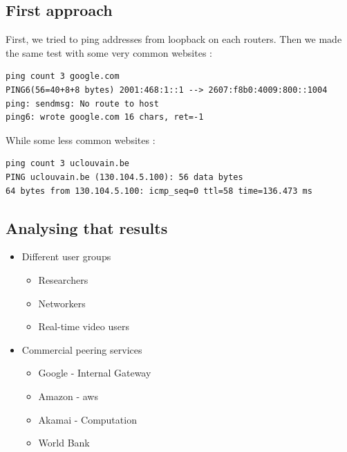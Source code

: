 \documentclass[usenames,dvipsnames]{beamer}
\begin{document}
\subsection{First approach}
\begin{frame}[fragile]{\insertsection}
\textbf{\insertsubsection}
\vfill
First, we tried to ping addresses from loopback on each routers. Then we made the same test with some very common websites :
\begin{lstlisting}
ping count 3 google.com 
PING6(56=40+8+8 bytes) 2001:468:1::1 --> 2607:f8b0:4009:800::1004
ping: sendmsg: No route to host
ping6: wrote google.com 16 chars, ret=-1
\end{lstlisting}
\vfill
While some less common websites :
\begin{lstlisting}
ping count 3 uclouvain.be 
PING uclouvain.be (130.104.5.100): 56 data bytes
64 bytes from 130.104.5.100: icmp_seq=0 ttl=58 time=136.473 ms
\end{lstlisting}

\end{frame}


\subsection{Analysing that results}
\begin{frame}{\insertsubsection}
\begin{itemize}
\item Different user groups
	\begin{itemize}
	\item Researchers
	\item Networkers
	\item Real-time video users
	\end{itemize}
\vfill
\item Commercial peering services
	\begin{itemize}
    \item Google - Internal Gateway
    \item Amazon - aws
    \item Akamai - Computation
    \item World Bank
    \end{itemize}
\end{itemize}
\end{frame}
\end{document}
